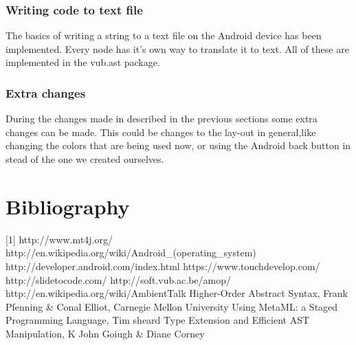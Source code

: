 \documentclass[a4paper,12pt]{report}
\begin{document}
\subsection{Writing code to text file}
The basics of writing a string to a text file on the Android device has been implemented. Every node has it's own way to translate it to text. All of these are implemented in the vub.ast package.

\subsection{Extra changes}
During the changes made in described in the previous sections some extra changes can be made. This could be changes to the lay-out in general,like changing the colors that are being used now, or using the Android 
back button in stead of the one we created ourselves.

\chapter*{Bibliography}
[1]  http://www.mt4j.org/ \newline
[2]  http://en.wikipedia.org/wiki/Android\_(operating\_system) \newline
[3]  http://developer.android.com/index.html \newline
[4]  https://www.touchdevelop.com/ \newline
[5]  http://slidetocode.com/ \newline
[6]  http://soft.vub.ac.be/amop/ \newline
[7]  http://en.wikipedia.org/wiki/AmbientTalk \newline
[8]  Higher-Order Abstract Syntax, Frank Pfenning \& Conal Elliot, Carnegie Mellon University \newline
[9]  Using MetaML: a Staged Programming Language, Tim sheard \newline
[10] Type Extension and Efficient AST Manipulation, K John Goiugh \& Diane Corney \newline
\end{document}
